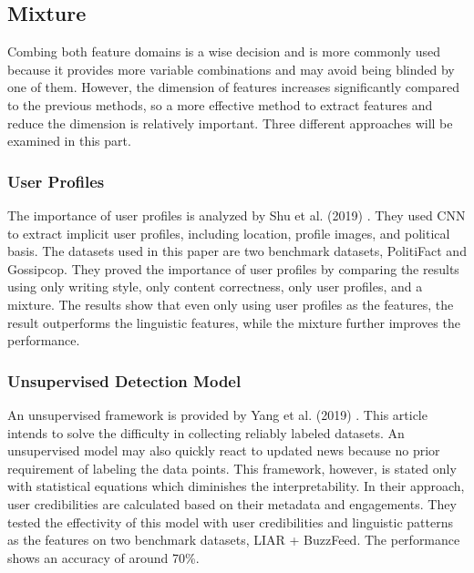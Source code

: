 \documentclass[sigconf ,nonacm]{acmart}
\begin{document}
\subsection{Mixture}
Combing both feature domains is a wise decision and is more commonly used because it provides more variable combinations and may avoid being blinded by one of them. However, the dimension of features increases significantly compared to the previous methods, so a more effective method to extract features and reduce the dimension is relatively important. Three different approaches will be examined in this part.

\subsubsection{User Profiles}
The importance of user profiles is analyzed by Shu et al. (2019) \cite{UserProfile}. They used CNN to extract implicit user profiles, including location, profile images, and political basis. The datasets used in this paper are two benchmark datasets, PolitiFact and Gossipcop. They proved the importance of user profiles by comparing the results using only writing style, only content correctness, only user profiles, and a mixture. The results show that even only using user profiles as the features, the result outperforms the linguistic features, while the mixture further improves the performance.

\subsubsection{Unsupervised Detection Model}
An unsupervised framework is provided by Yang et al. (2019) \cite{Unsupervised}. This article intends to solve the difficulty in collecting reliably labeled datasets. An unsupervised model may also quickly react to updated news because no prior requirement of labeling the data points. This framework, however, is stated only with statistical equations which diminishes the interpretability. In their approach, user credibilities are calculated based on their metadata and engagements. They tested the effectivity of this model with user credibilities and linguistic patterns as the features on two benchmark datasets, LIAR + BuzzFeed. The performance shows an accuracy of around 70\%. 
\end{document}
